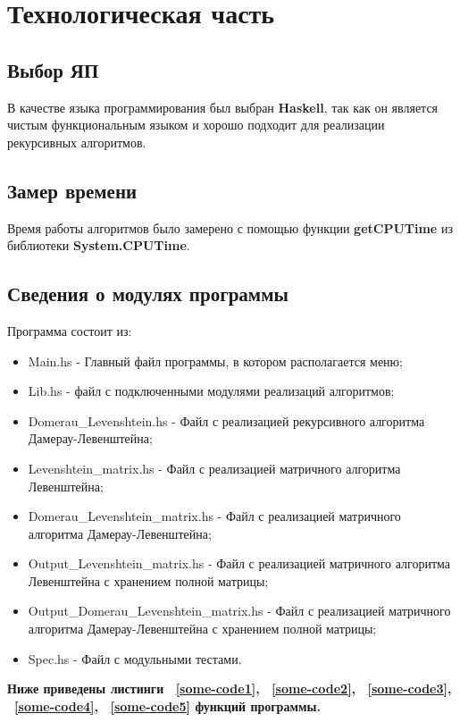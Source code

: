 \documentclass[12pt]{report}
\begin{document}
    \chapter{Технологическая часть}
    \section{Выбор ЯП}
    
    В качестве языка программирования был выбран {\bf Haskell}, так как он является чистым функциональным языком и хорошо подходит для реализации рекурсивных алгоритмов.
    ~\cite{Haskell}
    
    \section{Замер времени}
    
    Время работы алгоритмов было замерено с помощью функции {\bf getCPUTime} из библиотеки {\bf System.CPUTime}.
    
    
    
    \section{Сведения о модулях программы}
    Программа состоит из:
    \begin{itemize}
    	\item Main.hs - Главный файл программы, в котором располагается меню;
    	\item Lib.hs - файл с подключенными модулями реализаций алгоритмов;
    	\item Domerau\_Levenshtein.hs - Файл с реализацией рекурсивного алгоритма Дамерау-Левенштейна;
    	\item Levenshtein\_matrix.hs - Файл с реализацией матричного алгоритма Левенштейна;
    	\item Domerau\_Levenshtein\_matrix.hs - Файл с реализацией матричного алгоритма Дамерау-Левенштейна;
    	\item Output\_Levenshtein\_matrix.hs - Файл с реализацией матричного алгоритма Левенштейна с хранением полной матрицы;
    	\item Output\_Domerau\_Levenshtein\_matrix.hs - Файл с реализацией матричного алгоритма Дамерау-Левенштейна  с хранением полной матрицы;
    	\item Spec.hs - Файл с модульными тестами.
    \end{itemize}

	{\bf Ниже приведены листинги  ~\ref{some-code1}, ~\ref{some-code2}, ~\ref{some-code3}, ~\ref{some-code4}, ~\ref{some-code5} функций программы.}
	    
\end{document}
